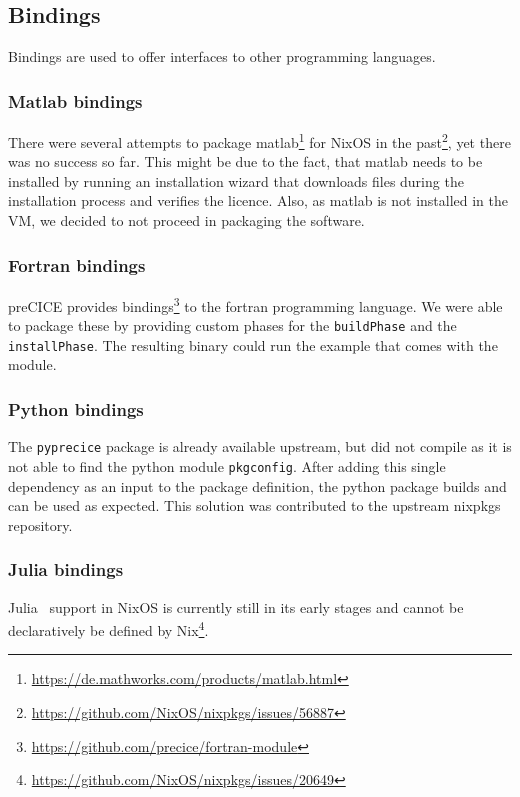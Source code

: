 \documentclass{eceasst}
\begin{document}
\subsection{Bindings}

Bindings are used to offer interfaces to other programming languages.

\subsubsection{Matlab bindings}

There were several attempts to package matlab\footnote{\url{https://de.mathworks.com/products/matlab.html}} for NixOS in the past\footnote{\url{https://github.com/NixOS/nixpkgs/issues/56887}}, yet there was no success so far.
This might be due to the fact, that matlab needs to be installed by running an installation wizard that downloads files during the installation process and verifies the licence.
Also, as matlab is not installed in the VM, we decided to not proceed in packaging the software.

\subsubsection{Fortran bindings}

preCICE provides bindings\footnote{\url{https://github.com/precice/fortran-module}} to the fortran programming language.
We were able to package these by providing custom phases for the \texttt{buildPhase} and the \texttt{installPhase}.
The resulting binary could run the example that comes with the module.

\subsubsection{Python bindings}

The \texttt{pyprecice} package is already available upstream, but did not compile as it is not able to find the python module \texttt{pkgconfig}.
After adding this single dependency as an input to the package definition, the python package builds and can be used as expected.
This solution was contributed to the upstream nixpkgs repository.

\subsubsection{Julia bindings}

Julia~\cite{bezanson2017julia} support in NixOS is currently still in its early stages and cannot be declaratively be defined by Nix\footnote{\url{https://github.com/NixOS/nixpkgs/issues/20649}}.
\end{document}
